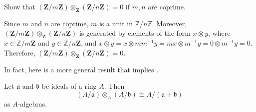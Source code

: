 \begin{exercise}
Show that \((\mathbf{Z} / m \mathbf{Z}) \otimes_{\mathbf{Z}} (\mathbf{Z} / n \mathbf{Z}) = 0\) if \(m, n\) are coprime.
\end{exercise}

\begin{solution}
Since \(m\) and \(n\) are coprime, \(m\) is a unit in \(\mathbb{Z} / n \mathbb{Z}\).
Moreover, \((\mathbf{Z} / m \mathbf{Z}) \otimes_{\mathbf{Z}} (\mathbf{Z} / n \mathbf{Z})\) is generated by elements of the form \(x \otimes y\), where \(x \in \mathbb{Z} / m \mathbf{Z}\) and \(y \in \mathbb{Z} / n \mathbf{Z}\), and \(x \otimes y = x \otimes m m^{-1} y = m x \otimes m^{-1} y = 0 \otimes m^{-1} y = 0\).
Therefore, \((\mathbf{Z} / m \mathbf{Z}) \otimes_{\mathbf{Z}} (\mathbf{Z} / n \mathbf{Z}) = 0\).
\end{solution}

In fact, here is a more general result that implies .

\begin{claim}
Let \(\mathfrak{a}\) and \(\mathfrak{b}\) be ideals of a ring \(A\).
Then
\begin{equation*}
(A / \mathfrak{a}) \otimes_A (A / \mathfrak{b}) \cong A / (\mathfrak{a} + \mathfrak{b})
\end{equation*}
as \(A\)-algebras.
\end{claim}

